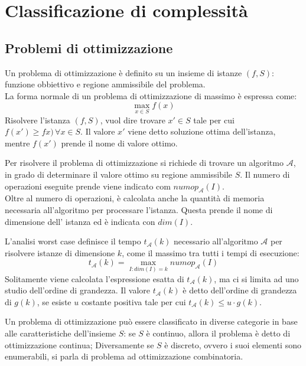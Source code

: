 \documentclass[../template]{subfiles}
\begin{document}
\section{Classificazione di complessità}
\subsection{Problemi di ottimizzazione}
Un problema di ottimizzazione è definito su un insieme di istanze $(f, S)$: funzione obbiettivo e regione ammissibile del problema.
\\
La forma normale di un problema di ottimizzazione di massimo è espressa come:
\[
    \max_{x \in S} f(x)
\]
Risolvere l'istanza $(f, S)$, vuol dire trovare $x' \in S$ tale per cui $f(x') \ge fx) \, \forall x \in S$. Il valore $x'$ viene detto soluzione ottima dell'istanza, mentre $f(x')$ prende il nome di valore ottimo.

Per risolvere il problema di ottimizzazione si richiede di trovare un algoritmo $\mathcal{A}$, in grado di determinare il valore ottimo su regione ammissibile $S$. Il numero di operazioni eseguite prende viene indicato com $numop_\mathcal{A}(I)$.
\\
Oltre al numero di operazioni, è calcolata anche la quantità di memoria necessaria all'algoritmo per processare l'istanza. Questa prende il nome di dimensione dell' istanza ed è indicata con $dim(I)$.

L'analisi worst case definisce il tempo $t_\mathcal{A}(k)$ necessario all'algoritmo $\mathcal{A}$ per risolvere istanze di dimensione $k$, come il massimo tra tutti i tempi di esecuzione:
\[
    t_\mathcal{A}(k) = \max_{I: dim(I) = k} numop_\mathcal{A}(I)
\]
Solitamente viene calcolata l'espressione esatta di $t_\mathcal{A}(k)$, ma ci si limita ad uno studio dell'ordine di grandezza.
Il valore $t_\mathcal{A}(k)$ è detto dell'ordine di grandezza di $g(k)$, se esiste $u$ costante positiva tale per cui $t_\mathcal{A}(k) \le u \cdot g(k)$.

Un problema di ottimizzazione può essere classificato in diverse categorie in base alle caratteristiche dell'insieme $S$:
se $S$ è continuo, allora il problema è detto di ottimizzazione continua; Diversamente se $S$ è discreto, ovvero i suoi elementi sono enumerabili, si parla di problema ad ottimizzazione combinatoria.


\end{document}
